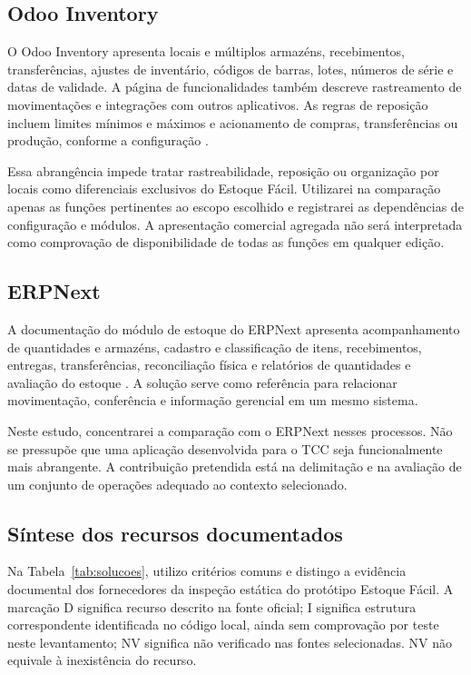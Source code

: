 \subsection{Odoo Inventory}

O Odoo Inventory apresenta locais e múltiplos armazéns, recebimentos, transferências, ajustes de inventário, códigos de barras, lotes, números de série e datas de validade. A página de funcionalidades também descreve rastreamento de movimentações e integrações com outros aplicativos. As regras de reposição incluem limites mínimos e máximos e acionamento de compras, transferências ou produção, conforme a configuração \cite{OdooInventoryFeatures,OdooReposicao}.

Essa abrangência impede tratar rastreabilidade, reposição ou organização por locais como diferenciais exclusivos do Estoque Fácil. Utilizarei na comparação apenas as funções pertinentes ao escopo escolhido e registrarei as dependências de configuração e módulos. A apresentação comercial agregada não será interpretada como comprovação de disponibilidade de todas as funções em qualquer edição.

\subsection{ERPNext}

A documentação do módulo de estoque do ERPNext apresenta acompanhamento de quantidades e armazéns, cadastro e classificação de itens, recebimentos, entregas, transferências, reconciliação física e relatórios de quantidades e avaliação do estoque \cite{ERPNextStock}. A solução serve como referência para relacionar movimentação, conferência e informação gerencial em um mesmo sistema.

Neste estudo, concentrarei a comparação com o ERPNext nesses processos. Não se pressupõe que uma aplicação desenvolvida para o TCC seja funcionalmente mais abrangente. A contribuição pretendida está na delimitação e na avaliação de um conjunto de operações adequado ao contexto selecionado.

\subsection{Síntese dos recursos documentados}

Na Tabela~\ref{tab:solucoes}, utilizo critérios comuns e distingo a evidência documental dos fornecedores da inspeção estática do protótipo Estoque Fácil. A marcação D significa recurso descrito na fonte oficial; I significa estrutura correspondente identificada no código local, ainda sem comprovação por teste neste levantamento; NV significa não verificado nas fontes selecionadas. NV não equivale à inexistência do recurso.

